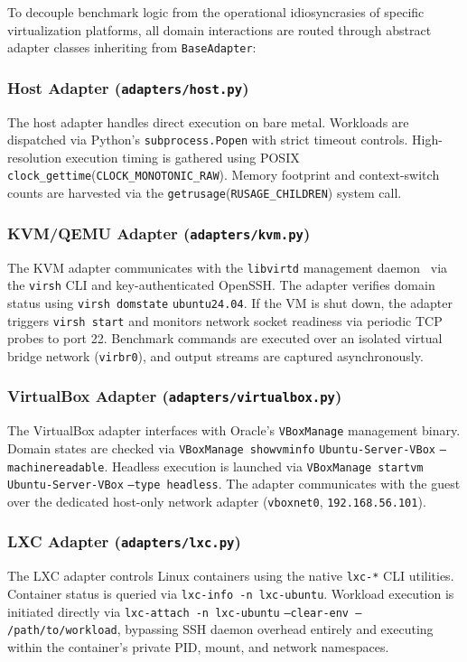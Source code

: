 To decouple benchmark logic from the operational idiosyncrasies of specific virtualization platforms, all domain interactions are routed through abstract adapter classes inheriting from \texttt{BaseAdapter}:

\subsubsection{Host Adapter (\texttt{adapters/host.py})}
The host adapter handles direct execution on bare metal. Workloads are dispatched via Python's \texttt{subprocess.Popen} with strict timeout controls. High-resolution execution timing is gathered using POSIX \texttt{clock\_gettime}(\texttt{CLOCK\_}\allowbreak\texttt{MONOTONIC\_RAW}). Memory footprint and context-switch counts are harvested via the \texttt{getrusage}(\texttt{RUSAGE\_CHILDREN}) system call.

\subsubsection{KVM/QEMU Adapter (\texttt{adapters/kvm.py})}
The KVM adapter communicates with the \texttt{libvirtd} management daemon~\cite{libvirt2024} via the \texttt{virsh} CLI and key-authenticated OpenSSH. The adapter verifies domain status using \texttt{virsh domstate} \texttt{ubuntu24.04}. If the VM is shut down, the adapter triggers \texttt{virsh start} and monitors network socket readiness via periodic TCP probes to port 22. Benchmark commands are executed over an isolated virtual bridge network (\texttt{virbr0}), and output streams are captured asynchronously.

\subsubsection{VirtualBox Adapter (\texttt{adapters/virtualbox.py})}
The VirtualBox adapter interfaces with Oracle's \texttt{VBoxManage} management binary. Domain states are checked via \texttt{VBoxManage showvminfo} \texttt{Ubuntu-Server-VBox} \texttt{--machinereadable}. Headless execution is launched via \texttt{VBoxManage startvm} \texttt{Ubuntu-Server-VBox} \texttt{--type headless}. The adapter communicates with the guest over the dedicated host-only network adapter (\texttt{vboxnet0}, \texttt{192.168.56.101}).

\subsubsection{LXC Adapter (\texttt{adapters/lxc.py})}
The LXC adapter controls Linux containers using the native \texttt{lxc-*} CLI utilities. Container status is queried via \texttt{lxc-info -n lxc-ubuntu}. Workload execution is initiated directly via \texttt{lxc-attach -n lxc-ubuntu} \allowbreak\texttt{--clear-env --} \allowbreak\texttt{/path/to/workload}, bypassing SSH daemon overhead entirely and executing within the container's private PID, mount, and network namespaces.

